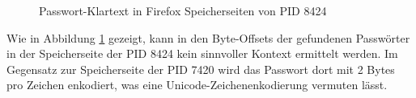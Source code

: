 \begin{figure}[h!]
	\centering
	\hfill
	\caption{Passwort-Klartext in Firefox Speicherseiten von PID 8424}
	\label{img:firefox-pw-offset-pid-8424}  
\end{figure}
Wie in Abbildung \ref{img:firefox-pw-offset-pid-8424} gezeigt, kann in den Byte-Offsets der gefundenen Passwörter in der Speicherseite der PID 8424 kein sinnvoller Kontext ermittelt werden. Im Gegensatz zur Speicherseite der PID 7420 wird das Passwort dort mit 2 Bytes pro Zeichen enkodiert, was eine Unicode-Zeichenenkodierung vermuten lässt.

